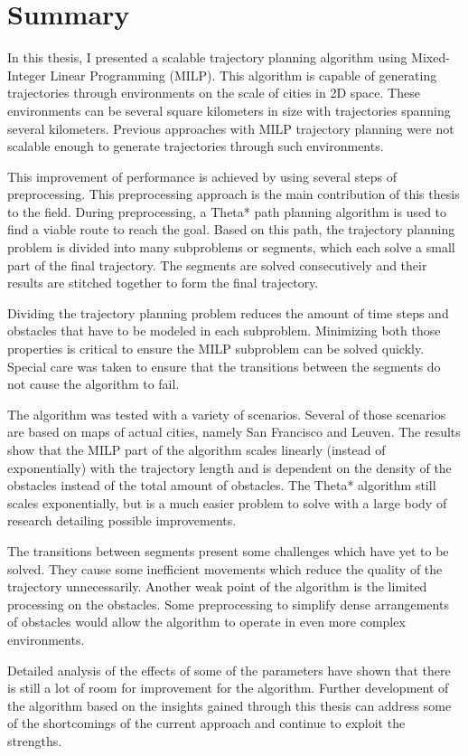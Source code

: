 \section{Summary}
In this thesis, I presented a scalable trajectory planning algorithm using Mixed-Integer Linear Programming (MILP). This algorithm is capable of generating trajectories through environments on the scale of cities in 2D space. These environments can be several square kilometers in size with trajectories spanning several kilometers. Previous approaches with MILP trajectory planning were not scalable enough to generate trajectories through such environments.
\par
This improvement of performance is achieved by using several steps of preprocessing. This preprocessing approach is the main contribution of this thesis to the field. During preprocessing, a Theta* path planning algorithm is used to find a viable route to reach the goal. Based on this path, the trajectory planning problem is divided into many subproblems or segments, which each solve a small part of the final trajectory. The segments are solved consecutively and their results are stitched together to form the final trajectory.
\par
Dividing the trajectory planning problem reduces the amount of time steps and obstacles that have to be modeled in each subproblem. Minimizing both those properties is critical to ensure the MILP subproblem can be solved quickly. Special care was taken to ensure that the transitions between the segments do not cause the algorithm to fail.
\par
The algorithm was tested with a variety of scenarios. Several of those scenarios are based on maps of actual cities, namely San Francisco and Leuven. The results show that the MILP part of the algorithm scales linearly (instead of exponentially) with the trajectory length and is dependent on the density of the obstacles instead of the total amount of obstacles. The Theta* algorithm still scales exponentially, but is a much easier problem to solve with a large body of research detailing possible improvements.
\par
The transitions between segments present some challenges which have yet to be solved. They cause some inefficient movements which reduce the quality of the trajectory unnecessarily. Another weak point of the algorithm is the limited processing on the obstacles. Some preprocessing to simplify dense arrangements of obstacles would allow the algorithm to operate in even more complex environments.
\par
Detailed analysis of the effects of some of the parameters have shown that there is still a lot of room for improvement for the algorithm. Further development of the algorithm based on the insights gained through this thesis can address some of the shortcomings of the current approach and continue to exploit the strengths.

